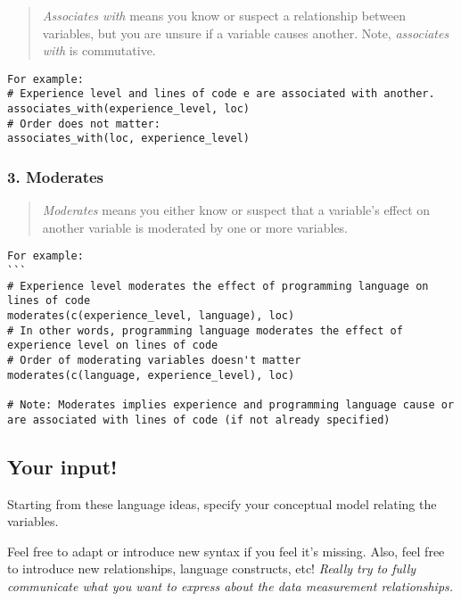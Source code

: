 \begin{quote}
\emph{Associates with} means you know or suspect a relationship between
variables, but you are unsure if a variable causes another. Note,
\emph{associates with} is commutative.
\end{quote}

\begin{verbatim}
For example:
# Experience level and lines of code e are associated with another.
associates_with(experience_level, loc)
# Order does not matter:
associates_with(loc, experience_level)
\end{verbatim}

\hypertarget{moderates}{%
\subsubsection{3. Moderates}\label{moderates}}

\begin{quote}
\emph{Moderates} means you either know or suspect that a variable's
effect on another variable is moderated by one or more variables.
\end{quote}

\begin{verbatim}
For example:
```
# Experience level moderates the effect of programming language on lines of code
moderates(c(experience_level, language), loc)
# In other words, programming language moderates the effect of experience level on lines of code
# Order of moderating variables doesn't matter
moderates(c(language, experience_level), loc)

# Note: Moderates implies experience and programming language cause or are associated with lines of code (if not already specified)
\end{verbatim}

\hypertarget{your-input}{%
\subsection*{Your input!}\label{your-input}}

Starting from these language ideas, specify your conceptual model
relating the variables.

Feel free to adapt or introduce new syntax if you feel it's missing.
Also, feel free to introduce new relationships, language constructs,
etc! \emph{Really try to fully communicate what you want to express
about the data measurement relationships.}
\clearpage

